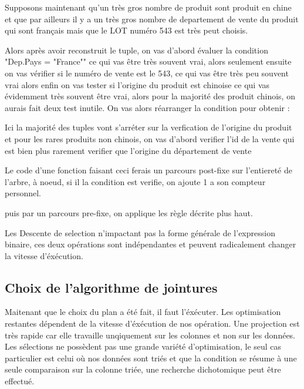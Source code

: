 \documentclass[12pt,a4paper]{article}
\begin{document}
Supposons maintenant qu'un très gros nombre de produit sont produit en chine et que par ailleurs il y a un très gros nombre de departement de vente du produit qui sont français mais que le LOT numéro 543 est très peut choisis.

Alors après avoir reconstruit le tuple, on vas d'abord évaluer la condition "Dep.Pays = "France"" ce qui vas être très souvent vrai, alors seulement ensuite on vas vérifier si le numéro de vente est le 543, ce qui vas être très peu souvent vrai alors enfin on vas tester si l'origine du produit est chinoise ce qui vas évidemment très souvent être vrai, alors pour la majorité des produit chinois, on aurais fait deux test inutile. On vas alors réarranger la condition pour obtenir :
\begin{center}

\end{center}

Ici la majorité des tuples vont s'arréter sur la verfication de l'origine du produit et pour les rares produits non chinois, on vas d'abord verifier l'id de la vente qui est bien plus rarement verifier que l'origine du département de vente

Le code d'une fonction faisant ceci ferais un parcours post-fixe sur l'entiereté de l'arbre, à noeud, si il la condition est verifie, on ajoute 1 a son compteur personnel.

puis par un parcours pre-fixe, on applique les règle décrite plus haut.

Les Descente de selection n'impactant pas la forme générale de l'expression binaire, ces deux opérations sont indépendantes et peuvent radicalement changer la vitesse d'éxécution.
\subsection{Choix de l'algorithme de jointures}
Maitenant que le choix du plan a été fait, il faut l'éxécuter. Les optimisation restantes dépendent de la vitesse d'éxécution de nos opération. Une projection est très rapide car elle travaille unqiquement sur les colonnes et non sur les données. Les sélections ne possèdent pas une grande variété d'optimisation, le seul cas particulier est celui où nos données sont triés et que la condition se résume à une seule comparaison sur la colonne triée, une recherche dichotomique peut être effectué.
\end{document}
